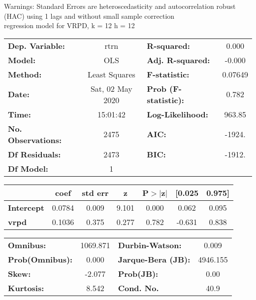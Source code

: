 Warnings: \newline
 [1] Standard Errors are heteroscedasticity and autocorrelation robust (HAC) using 1 lags and without small sample correction\\ 

regression model for VRPD, k = 12 h = 12\begin{center}
\begin{tabular}{lclc}
\toprule
\textbf{Dep. Variable:}    &       rtrn       & \textbf{  R-squared:         } &     0.000   \\
\textbf{Model:}            &       OLS        & \textbf{  Adj. R-squared:    } &    -0.000   \\
\textbf{Method:}           &  Least Squares   & \textbf{  F-statistic:       } &   0.07649   \\
\textbf{Date:}             & Sat, 02 May 2020 & \textbf{  Prob (F-statistic):} &    0.782    \\
\textbf{Time:}             &     15:01:42     & \textbf{  Log-Likelihood:    } &    963.85   \\
\textbf{No. Observations:} &        2475      & \textbf{  AIC:               } &    -1924.   \\
\textbf{Df Residuals:}     &        2473      & \textbf{  BIC:               } &    -1912.   \\
\textbf{Df Model:}         &           1      & \textbf{                     } &             \\
\bottomrule
\end{tabular}
\begin{tabular}{lcccccc}
                   & \textbf{coef} & \textbf{std err} & \textbf{z} & \textbf{P$> |$z$|$} & \textbf{[0.025} & \textbf{0.975]}  \\
\midrule
\textbf{Intercept} &       0.0784  &        0.009     &     9.101  &         0.000        &        0.062    &        0.095     \\
\textbf{vrpd}      &       0.1036  &        0.375     &     0.277  &         0.782        &       -0.631    &        0.838     \\
\bottomrule
\end{tabular}
\begin{tabular}{lclc}
\textbf{Omnibus:}       & 1069.871 & \textbf{  Durbin-Watson:     } &    0.009  \\
\textbf{Prob(Omnibus):} &   0.000  & \textbf{  Jarque-Bera (JB):  } & 4946.155  \\
\textbf{Skew:}          &  -2.077  & \textbf{  Prob(JB):          } &     0.00  \\
\textbf{Kurtosis:}      &   8.542  & \textbf{  Cond. No.          } &     40.9  \\
\bottomrule
\end{tabular}
\end{center}

